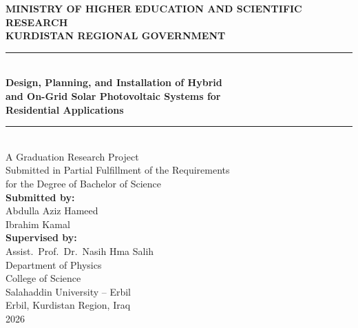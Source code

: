 \documentclass[12pt, a4paper]{report}
\begin{document}
\begin{titlepage}
    \centering
    \vspace*{1.5cm}

    {\large\textbf{MINISTRY OF HIGHER EDUCATION AND SCIENTIFIC RESEARCH}}\\[0.3cm]
    {\large\textbf{KURDISTAN REGIONAL GOVERNMENT}}\\[1.5cm]

    \rule{\textwidth}{1.5pt}\\[0.5cm]
    {\LARGE\bfseries Design, Planning, and Installation of Hybrid\\[0.3cm]
    and On-Grid Solar Photovoltaic Systems for\\[0.3cm]
    Residential Applications}\\[0.5cm]
    \rule{\textwidth}{1.5pt}\\[1.5cm]

    {\large A Graduation Research Project\\
    Submitted in Partial Fulfillment of the Requirements\\
    for the Degree of Bachelor of Science}\\[1.5cm]

    {\large\textbf{Submitted by:}}\\[0.3cm]
    {\large Abdulla Aziz Hameed}\\[0.15cm]
    {\large Ibrahim Kamal}\\[1cm]

    {\large\textbf{Supervised by:}}\\[0.3cm]
    {\large Assist.\ Prof.\ Dr.\ Nasih Hma Salih}\\[1.5cm]

    {\large Department of Physics\\
    College of Science\\
    Salahaddin University -- Erbil}\\[1cm]

    {\large Erbil, Kurdistan Region, Iraq\\
    2026}

\end{titlepage}

\tableofcontents
\newpage
\listoftables
\newpage
{}








\end{document}
